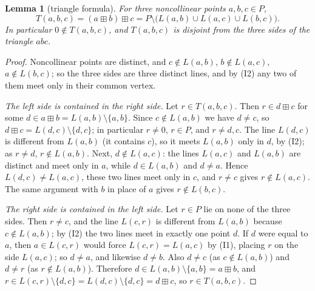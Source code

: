 \documentclass[11pt]{article}
\theoremstyle{plain}
\newtheorem{lemma}[theorem]{Lemma}
\theoremstyle{definition}
\newcommand{\bp}{\boxplus}
\begin{document}
\begin{lemma}[triangle formula]\label{lem:triangle}
For three noncollinear points $a,b,c\in P$,
\begin{equation}\label{eq:triangle}
 T(a,b,c)=(a\bp b)\bp c
 =P\setminus\bigl(L(a,b)\cup L(a,c)\cup L(b,c)\bigr).
\end{equation}
In particular $0\notin T(a,b,c)$, and $T(a,b,c)$ is disjoint from the
three sides of the triangle $abc$.
\end{lemma}
\begin{proof}
Noncollinear points are distinct, and $c\notin L(a,b)$,
$b\notin L(a,c)$, $a\notin L(b,c)$; so the three sides are three distinct
lines, and by (I2) any two of them meet only in their common vertex.

\emph{The left side is contained in the right side.}
Let $r\in T(a,b,c)$.  Then $r\in d\bp c$ for some
$d\in a\bp b=L(a,b)\setminus\{a,b\}$.  Since $c\notin L(a,b)$ we have
$d\neq c$, so $d\bp c=L(d,c)\setminus\{d,c\}$; in particular $r\neq0$,
$r\in P$, and $r\neq d,c$.  The line $L(d,c)$ is different from
$L(a,b)$ (it contains $c$), so it meets $L(a,b)$ only in $d$, by (I2);
as $r\neq d$, $r\notin L(a,b)$.  Next, $d\notin L(a,c)$: the lines
$L(a,c)$ and $L(a,b)$ are distinct and meet only in $a$, while
$d\in L(a,b)$ and $d\neq a$.  Hence $L(d,c)\neq L(a,c)$, these two
lines meet only in $c$, and $r\neq c$ gives $r\notin L(a,c)$.  The same
argument with $b$ in place of $a$ gives $r\notin L(b,c)$.

\emph{The right side is contained in the left side.}
Let $r\in P$ lie on none of the three sides.  Then $r\neq c$, and the
line $L(c,r)$ is different from $L(a,b)$ because $c\notin L(a,b)$; by
(I2) the two lines meet in exactly one point $d$.  If $d$ were equal to
$a$, then $a\in L(c,r)$ would force $L(c,r)=L(a,c)$ by (I1), placing
$r$ on the side $L(a,c)$; so $d\neq a$, and likewise $d\neq b$.  Also
$d\neq c$ (as $c\notin L(a,b)$) and $d\neq r$ (as $r\notin L(a,b)$).
Therefore $d\in L(a,b)\setminus\{a,b\}=a\bp b$, and
$r\in L(c,r)\setminus\{d,c\}=L(d,c)\setminus\{d,c\}=d\bp c$, so
$r\in T(a,b,c)$.
\end{proof}
\end{document}
